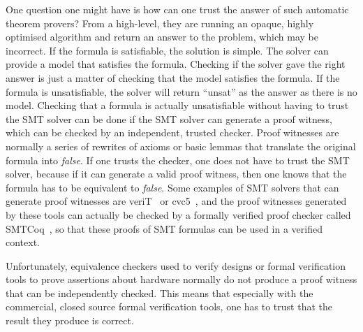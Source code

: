 One question one might have is how can one trust the answer of such automatic
theorem provers?  From a high-level, they are running an opaque, highly
optimised algorithm and return an answer to the problem, which may be incorrect.
If the formula is satisfiable, the solution is simple.  The solver can provide a
model that satisfies the formula.  Checking if the solver gave the right answer
is just a matter of checking that the model satisfies the formula.  If the
formula is unsatisfiable, the solver will return \enquote{unsat} as the answer
as there is no model.  Checking that a formula is actually unsatisfiable without
having to trust the \gls{SMT} solver can be done if the \gls{SMT} solver can
generate a proof witness, which can be checked by an independent, trusted
checker.  Proof witnesses are normally a series of rewrites of axioms or basic
lemmas that translate the original formula into \textit{false}.  If one trusts
the checker, one does not have to trust the \gls{SMT} solver, because if it can
generate a valid proof witness, then one knows that the formula has to be
equivalent to \textit{false}.  Some examples of \gls{SMT} solvers that can
generate proof witnesses are veriT~\cite{bouton09} or
cvc5~\cite[]{barbosa22_cvc5}, and the proof witnesses generated by these tools
can actually be checked by a formally verified proof checker called
SMTCoq~\cite{armand11_modul_integ_sat_smt_solver}, so that these proofs of
\gls{SMT} formulas can be used in a verified context.

Unfortunately, equivalence checkers used to verify designs or formal
verification tools to prove assertions about hardware normally do not produce a
proof witness that can be independently checked.  This means that especially
with the commercial, closed source formal verification tools, one has to trust
that the result they produce is correct.

%

